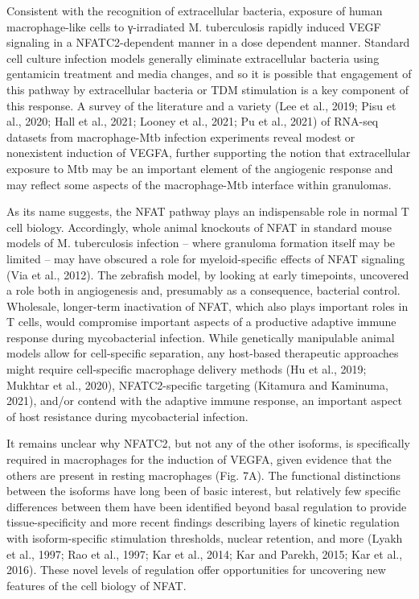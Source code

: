 Consistent with the recognition of extracellular bacteria, exposure of human macrophage-like cells to γ-irradiated M. tuberculosis rapidly induced VEGF signaling in a NFATC2-dependent manner in a dose dependent manner. Standard cell culture infection models generally eliminate extracellular bacteria using gentamicin treatment and media changes, and so it is possible that engagement of this pathway by extracellular bacteria or TDM stimulation is a key component of this response. A survey of the literature and a variety (Lee et al., 2019; Pisu et al., 2020; Hall et al., 2021; Looney et al., 2021; Pu et al., 2021) of RNA-seq datasets from macrophage-Mtb infection experiments reveal modest or nonexistent induction of VEGFA, further supporting the notion that extracellular exposure to Mtb may be an important element of the angiogenic response and may reflect some aspects of the macrophage-Mtb interface within granulomas.

As its name suggests, the NFAT pathway plays an indispensable role in normal T cell biology. Accordingly, whole animal knockouts of NFAT in standard mouse models of M. tuberculosis infection – where granuloma formation itself may be limited – may have obscured a role for myeloid-specific effects of NFAT signaling (Via et al., 2012). The zebrafish model, by looking at early timepoints, uncovered a role both in angiogenesis and, presumably as a consequence, bacterial control. Wholesale, longer-term inactivation of NFAT, which also plays important roles in T cells, would compromise important aspects of a productive adaptive immune response during mycobacterial infection. While genetically manipulable animal models allow for cell-specific separation, any host-based therapeutic approaches might require cell-specific macrophage delivery methods (Hu et al., 2019; Mukhtar et al., 2020), NFATC2-specific targeting (Kitamura and Kaminuma, 2021), and/or contend with the adaptive immune response, an important aspect of host resistance during mycobacterial infection.

It remains unclear why NFATC2, but not any of the other isoforms, is specifically required in macrophages for the induction of VEGFA, given evidence that the others are present in resting macrophages (Fig. 7A). The functional distinctions between the isoforms have long been of basic interest, but relatively few specific differences between them have been identified beyond basal regulation to provide tissue-specificity and more recent findings describing layers of kinetic regulation with isoform-specific stimulation thresholds, nuclear retention, and more (Lyakh et al., 1997; Rao et al., 1997; Kar et al., 2014; Kar and Parekh, 2015; Kar et al., 2016). These novel levels of regulation offer opportunities for uncovering new features of the cell biology of NFAT.

